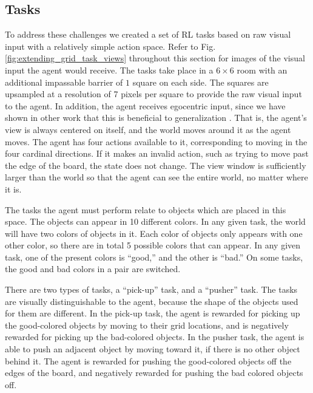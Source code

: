 \subsection{Tasks}
To address these challenges we created a set of RL tasks based on raw visual input with a relatively simple action space. Refer to Fig. \ref{fig:extending_grid_task_views} throughout this section for images of the visual input the agent would receive. The tasks take place in a \(6 \times 6\) room with an additional impassable barrier of \(1\) square on each side. The squares are upsampled at a resolution of 7 pixels per square to provide the raw visual input to the agent. In addition, the agent receives egocentric input, since we have shown in other work that this is beneficial to generalization \citep{Hill2019a}. That is, the agent's view is always centered on itself, and the world moves around it as the agent moves. The agent has four actions available to it, corresponding to moving in the four cardinal directions. If it makes an invalid action, such as trying to move past the edge of the board, the state does not change. The view window is sufficiently larger than the world so that the agent can see the entire world, no matter where it is.\par 
The tasks the agent must perform relate to objects which are placed in this space. The objects can appear in 10 different colors. In any given task, the world will have two colors of objects in it. Each color of objects only appears with one other color, so there are in total 5 possible colors that can appear. In any given task, one of the present colors is ``good,'' and the other is ``bad.'' On some tasks, the good and bad colors in a pair are switched.\par
There are two types of tasks, a ``pick-up'' task, and a ``pusher'' task. The tasks are visually distinguishable to the agent, because the shape of the objects used for them are different. In the pick-up task, the agent is rewarded for picking up the good-colored objects by moving to their grid locations, and is negatively rewarded for picking up the bad-colored objects. In the pusher task, the agent is able to push an adjacent object by moving toward it, if there is no other object behind it. The agent is rewarded for pushing the good-colored objects off the edges of the board, and negatively rewarded for pushing the bad colored objects off. \par 
